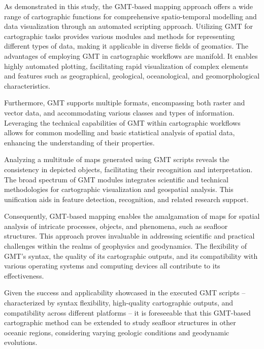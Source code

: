 \documentclass[geomatics,article,accept,pdftex,moreauthors]{Definitions/mdpi}
\begin{document}
As demonstrated in this study, the GMT-based mapping approach offers a wide range of cartographic functions for comprehensive spatio-temporal modelling and data visualization through an automated scripting approach. Utilizing GMT for cartographic tasks provides various modules and methods for representing different types of data, making it applicable in diverse fields of geomatics. The advantages of employing GMT in cartographic workflows are manifold. It enables highly automated plotting, facilitating rapid visualization of complex elements and features such as geographical, geological, oceanological, and geomorphological characteristics.

Furthermore, GMT supports multiple formats, encompassing both raster and vector data, and accommodating various classes and types of information. Leveraging the technical capabilities of GMT within cartographic workflows allows for common modelling and basic statistical analysis of spatial data, enhancing the understanding of their properties.

Analyzing a multitude of maps generated using GMT scripts reveals the consistency in depicted objects, facilitating their recognition and interpretation. The broad spectrum of GMT modules integrates scientific and technical methodologies for cartographic visualization and geospatial analysis. This unification aids in feature detection, recognition, and related research support.

Consequently, GMT-based mapping enables the amalgamation of maps for spatial analysis of intricate processes, objects, and phenomena, such as seafloor structures. This approach proves invaluable in addressing scientific and practical challenges within the realms of geophysics and geodynamics. The flexibility of GMT's syntax, the quality of its cartographic outputs, and its compatibility with various operating systems and computing devices all contribute to its effectiveness.

Given the success and applicability showcased in the executed GMT scripts – characterized by syntax flexibility, high-quality cartographic outputs, and compatibility across different platforms – it is foreseeable that this GMT-based cartographic method can be extended to study seafloor structures in other oceanic regions, considering varying geologic conditions and geodynamic evolutions.
\end{document}
